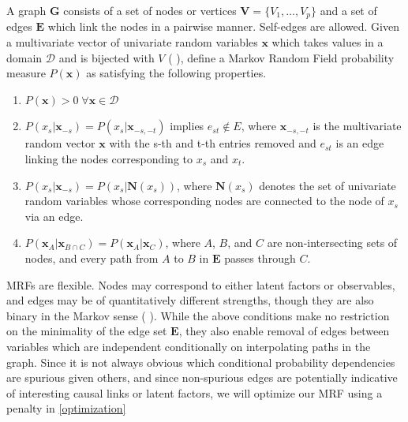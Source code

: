 \documentclass{samkoelleprelimworking}
\newcommand{\vmcomment}[1]{({\color{blue}{VM's comment:}} \textbf{\color{blue}{#1}})}
\begin{document}
A graph $\bm{G}$ consists of a set of nodes or vertices $\bm{V} = \{V_1, \dotsc , V_p \}$ and a set of edges $\bm{E}$ which link the nodes in a pairwise manner.  Self-edges are allowed.  Given a multivariate vector of univariate random variables $\bm{x}$ which takes values in a domain $\mathcal{D}$ and is bijected with $V$ \vmcomment{Not sure I know what it means ``to be bijected with something''}, define a Markov Random Field probability measure $P(\bm{x})$ as satisfying the following properties.
\begin{enumerate}
\item $P(\bm{x}) > 0 \; \forall \bm{x} \in \mathcal{D}$
\item $P(x_s \vert \bm{x}_{-s}) = P(x_s \vert \bm{x}_{-s,-t})$ implies $e_{st} \not\in E$, where $\bm{x}_{-s,-t}$ is the multivariate random vector $\bm{x}$ with the s-th and t-th entries removed and $e_{st}$ is an edge linking the nodes corresponding to $x_s$ and $x_t$.
\item $P(x_s \vert \bm{x}_{-s}) = P(x_s \vert \bm{N}(x_s))$, where $ \bm{N}(x_s)$ denotes the set of univariate random variables whose corresponding nodes are connected to the node of $x_s$ via an edge. 
\item $P(\bm{x}_A \vert \bm{x}_{B \cap C}) = P(\bm{x}_A \vert \bm{x}_C)$, where $A$, $B$, and $C$ are non-intersecting sets of nodes, and every path from $A$ to $B$ in $\bm{E}$ passes through $C$.
\end{enumerate}
MRFs are flexible.  Nodes may correspond to either latent factors or observables, and edges may be of quantitatively different strengths, though they are also binary in the Markov sense \vmcomment{Edges are just binary, there is no need for ``Markov sense''.}.  While the above conditions make no restriction on the minimality of the edge set $\bm{E}$, they also enable removal of edges between variables which are independent conditionally on interpolating paths in the graph.  Since it is not always obvious which conditional probability dependencies are spurious given others, and since non-spurious edges are potentially indicative of interesting causal links or latent factors, we will optimize our MRF using a penalty in \ref{optimization}
\end{document}
